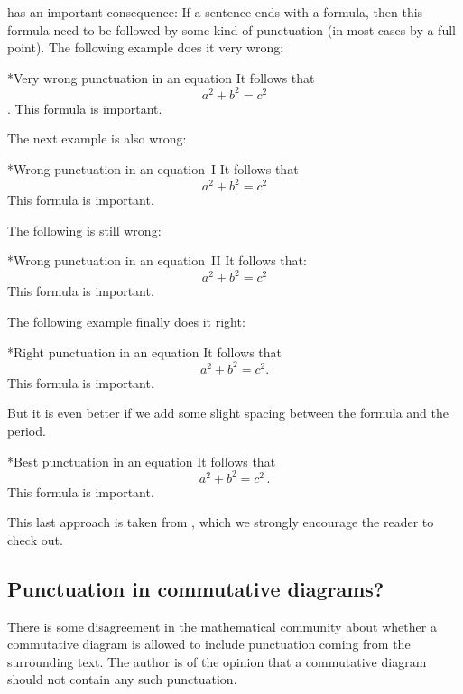 has an important consequence:
If a sentence ends with a formula, then this formula need to be followed by some kind of punctuation (in most cases by a full point).
The following example does it very wrong:
\begin{showlatex}*{Very wrong punctuation in an equation}
It follows that
\[
  a^2 + b^2 = c^2
\]
.
This formula is important.
\end{showlatex}
The next example is also wrong:
\begin{showlatex}*{Wrong punctuation in an equation~I}
It follows that
\[
  a^2 + b^2 = c^2
\]
This formula is important.
\end{showlatex}
The following is still wrong:
\begin{showlatex}*{Wrong punctuation in an equation~II}
It follows that:
\[
  a^2 + b^2 = c^2
\]
This formula is important.
\end{showlatex}
The following example finally does it right:
\begin{showlatex}*{Right punctuation in an equation}
It follows that
\[
  a^2 + b^2 = c^2.
\]
This formula is important.
\end{showlatex}
But it is even better if we add some slight spacing between the formula and the period.
\begin{showlatex}*{Best punctuation in an equation}
It follows that
\[
  a^2 + b^2 = c^2 \,.
\]
This formula is important.
\end{showlatex}
This last approach is taken from \cite{tex_period}, which we strongly encourage the reader to check out.




\subsection{Punctuation in commutative diagrams?}

There is some disagreement in the mathematical community about whether a commutative diagram is allowed to include punctuation coming from the surrounding text.
The author is of the opinion that a commutative diagram should not contain any such punctuation.

